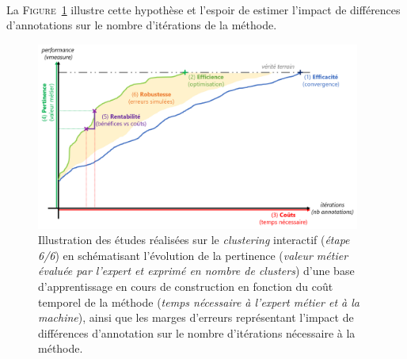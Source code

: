 	\begin{tcolorbox}[
		title=\faVial~\textbf{Hypothèse de robustesse}~\faVial,
		colback=colorTcolorboxHypothesis!15,
		colframe=colorTcolorboxHypothesis!75,
		width=\linewidth
	]
		 \\
		
		La \textsc{Figure~\ref{figure:4.6-HYPOTHESE-ROBUSTESSE}} illustre cette hypothèse et l'espoir de estimer l'impact de différences d'annotations sur le nombre d'itérations de la méthode.
		\begin{figure}[H]  %
			\centering
			\includegraphics[width=0.95\textwidth]{figures/hypotheses-06-robustesse}
			\caption{
				Illustration des études réalisées sur le \textit{clustering} interactif (\textit{étape 6/6}) en schématisant l'évolution de la pertinence (\textit{valeur métier évaluée par l'expert et exprimé en nombre de clusters}) d'une base d'apprentissage en cours de construction en fonction du coût temporel de la méthode (\textit{temps nécessaire à l'expert métier et à la machine}), ainsi que les marges d'erreurs représentant l'impact de différences d'annotation sur le nombre d'itérations nécessaire à la méthode.
			}
			\label{figure:4.6-HYPOTHESE-ROBUSTESSE}
		\end{figure}
	\end{tcolorbox}
		
